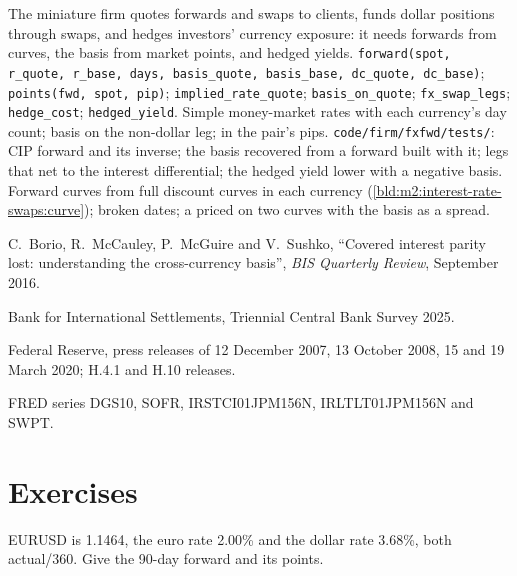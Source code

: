 \begin{build}
 The miniature firm quotes forwards and swaps to clients, funds
dollar positions through swaps, and hedges investors' currency exposure: it needs
forwards from curves, the basis from market points, and hedged yields.
 \texttt{forward(spot, r\_quote, r\_base, days, basis\_quote,
basis\_base, dc\_quote, dc\_base)}; \texttt{points(fwd, spot, pip)};
\texttt{implied\_rate\_quote}; \texttt{basis\_on\_quote}; \texttt{fx\_swap\_legs};
\texttt{hedge\_cost}; \texttt{hedged\_yield}.
 Simple money-market rates with each currency's day count; basis
on the non-dollar leg;  in the pair's pips.
 \texttt{code/firm/fxfwd/tests/}: CIP forward and its
inverse; the basis recovered from a forward built with it;  legs that
net to the interest differential; the hedged yield lower with a negative basis.
 Forward curves from full discount curves in each currency
(\cref{bld:m2:interest-rate-swaps:curve}); broken dates; a  priced on two curves with the basis as a spread.
\end{build}

\begin{omsources}
\item C.~Borio, R.~McCauley, P.~McGuire and V.~Sushko, ``Covered interest parity
lost: understanding the cross-currency basis'', \emph{BIS Quarterly Review},
September 2016.
\item Bank for International Settlements, Triennial Central Bank Survey 2025.
\item Federal Reserve, press releases of 12 December 2007, 13 October 2008, 15
and 19 March 2020; H.4.1 and H.10 releases.
\item FRED series DGS10, SOFR, IRSTCI01JPM156N, IRLTLT01JPM156N and SWPT.
\end{omsources}

\section{Exercises}

\begin{exercise}[$\star$]\label{exo:m2:fx-swaps-forwards-and-the-cross-currency-basis:1}
EURUSD is 1.1464, the euro rate 2.00\% and the dollar rate 3.68\%, both
actual/360. Give the 90-day forward and its points.
\end{exercise}

